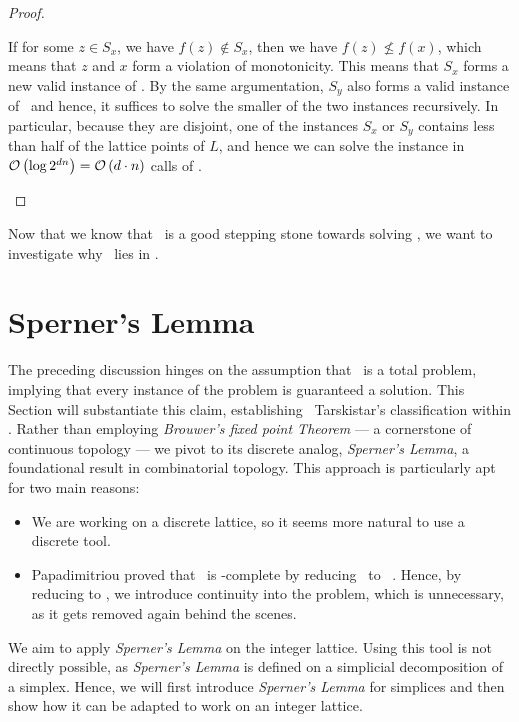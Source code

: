 \begin{proof}
\begin{case}{3}
		If for some $z \in S_x$, we have $f(z) \not\in S_x$, then we have $f(z) \not\leq f(x)$, which means that $z$ and $x$ form a violation of monotonicity. This means that $S_x$ forms a new valid instance of \Tarski. By the same argumentation, $S_y$ also forms a valid instance of \Tarski\, and hence, it suffices to solve the smaller of the two instances recursively. In particular, because they are disjoint, one of the instances $S_x$ or $S_y$ contains less than half of the lattice points of $L$, and hence we can solve the instance in $\mathcal{O}\left(\log{2^{dn}}\right) = \mathcal{O}\left(d \cdot n\right)$ calls of \Tarskistar.
	\end{case}
\end{proof}

Now that we know that \Tarskistar\ is a good stepping stone towards solving \Tarski, we want to investigate why \Tarskistar\ lies in \PPAD.

\section{Sperner's Lemma}

The preceding discussion hinges on the assumption that \Tarskistar\ is a total problem, implying that every instance of the problem is guaranteed a solution. This Section will substantiate this claim, establishing \ Tarskistar's classification within \TFNP. Rather than employing \textit{Brouwer's fixed point Theorem} --- a cornerstone of continuous topology --- we pivot to its discrete analog, \textit{Sperner's Lemma}, a foundational result in combinatorial topology. This approach is particularly apt for two main reasons:
\begin{itemize}
	\item We are working on a discrete lattice, so it seems more natural to use a discrete tool.
	\item Papadimitriou proved that \Brouwer\ is \PPAD-complete by reducing \Brouwer\ to \Sperner\ . Hence, by reducing to \Brouwer, we introduce continuity into the problem, which is unnecessary, as it gets removed again behind the scenes.
\end{itemize}

We aim to apply \textit{Sperner's Lemma} on the integer lattice. Using this tool is not directly possible, as \textit{Sperner's Lemma} is defined on a simplicial decomposition of a simplex. Hence, we will first introduce \textit{Sperner's Lemma} for simplices and then show how it can be adapted to work on an integer lattice.

